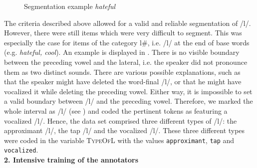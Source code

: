 \begin{figure} [b!]
	
	\caption{Segmentation example \textit{hateful}}
	\label{fig:segmentation hateful}
\end{figure}

The criteria described above allowed for a valid and reliable segmentation of /l/. However, there were still items which were very difficult to segment. This was especially the case for items of the category l\#, i.e. /l/ at the end of base words (e.g. \textit{hateful, cool}). An example is displayed in . There is no visible boundary between the preceding vowel and the lateral, i.e. the speaker did not pronounce them as two distinct sounds. There are various possible explanations, such as that the speaker might have deleted the word-final /l/, or that he might have vocalized it  while deleting the preceding vowel. Either way,  it is impossible to set a valid boundary between /l/ and the preceding vowel. Therefore, we marked the whole interval as /l/ (see ) and coded the pertinent tokens as featuring a vocalized /l/. Hence, the data set comprised three different types of /l/: the approximant /l/, the tap /l/ and the vocalized /l/. These three different types were coded in the variable \textsc{TypeOfL} with the values \texttt{approximant}, \texttt{tap} and \texttt{vocalized}.\\



\textbf{ 2.  Intensive training of the annotators}\\

